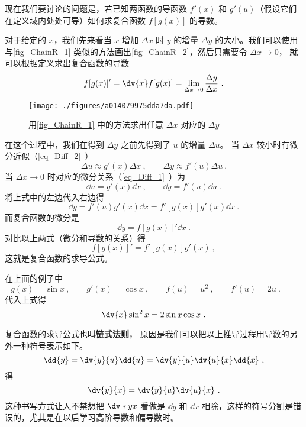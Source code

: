 现在我们要讨论的问题是，若已知两函数的导函数 $f'(x)$ 和 $g'(u)$（假设它们在定义域内处处可导）如何求复合函数 $f[g(x)]$ 的导数。

对于给定的 $x$，我们先来看当 $x$ 增加 $\Delta x$ 时 $y$ 的增量 $\Delta y$ 的大小。我们可以使用与\autoref{fig_ChainR_1} 类似的方法画出\autoref{fig_ChainR_2}，然后只需要令 $\Delta x \to 0$， 就可以根据定义求出复合函数的导数
\begin{equation}
f[g(x)]' = \dv{x} f[g(x)] = \lim_{\Delta x\to 0} \frac{\Delta y}{\Delta x}~.
\end{equation}

\begin{figure}[ht]
\centering
\texttt{[image: ./figures/a014079975dda7da.pdf]}
\caption{用\autoref{fig_ChainR_1} 中的方法求出任意 $\Delta x$ 对应的 $\Delta y$} \label{fig_ChainR_2}
\end{figure}

在这个过程中，我们在得到 $\Delta y$ 之前先得到了 $u$ 的增量 $\Delta u$。 当 $\Delta x$ 较小时有微分近似（\autoref{eq_Diff_2}~）
\begin{equation}
\Delta {u} \approx g'(x) \Delta{x}~,
\qquad
\Delta{y} \approx f'(u) \Delta{u}~.
\end{equation}
当 $\Delta x \to 0$ 时对应的微分关系（\autoref{eq_Diff_1}~）为
\begin{equation}
\dd{u} = g'(x) \dd{x}~,
\qquad
\dd{y} = f'(u) \dd{u}~.
\end{equation}
将上式中的左边代入右边得
\begin{equation}
\dd{y} = f'(u) g'(x) \dd{x} = f'[g(x)]g'(x) \dd{x}~.
\end{equation}
而复合函数的微分是
\begin{equation}
\dd{y} = f[g(x)]' \dd{x}~.
\end{equation}
对比以上两式（微分和导数的关系）得
\begin{equation}\label{eq_ChainR_4}
f[g(x)]' = f'[g(x)]g'(x)~,
\end{equation}
这就是复合函数的求导公式。

在上面的例子中 
\begin{equation}
g(x) = \sin x ~,\qquad
g'(x) = \cos x~, \qquad %
f(u) = u^2 ~,\qquad
f'(u) = 2u ~.\qquad
\end{equation}
代入上式得
\begin{equation}
\dv{x} \sin^2 x = 2\sin x \cos x~.
\end{equation}

复合函数的求导公式也叫\textbf{链式法则}， 原因是我们可以把以上推导过程用导数的另外一种符号表示如下。
\begin{equation}
\dd{y} = \dv{y}{u} \dd{u} = \dv{y}{u} \dv{u}{x} \dd{x}~,
\end{equation}
得
\begin{equation}
\dv{y}{x} = \dv{y}{u} \dv{u}{x}~.
\end{equation}
这种书写方式让人不禁想把 $\dv*{y}{x}$ 看做是 $\dd{y}$ 和 $\dd{x}$ 相除，这样的符号分割是错误的，尤其是在以后学习高阶导数和偏导数时。%

